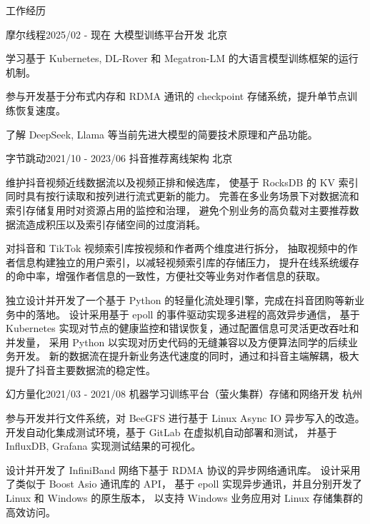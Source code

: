 \documentclass[
	a4paper,  %
	11pt,  %
]{resume}  %
\begin{document}
\begin{rSection}{工作经历}

	\begin{rSubsection}{摩尔线程}{2025/02 - 现在}{ 大模型训练平台开发 }{北京}
		\item 学习基于 Kubernetes, DL-Rover 和 Megatron-LM 的大语言模型训练框架的运行机制。
		\item 参与开发基于分布式内存和 RDMA 通讯的 checkpoint 存储系统，提升单节点训练恢复速度。
		\item 了解 DeepSeek, Llama 等当前先进大模型的简要技术原理和产品功能。
	\end{rSubsection}


	\begin{rSubsection}{字节跳动}{2021/10 - 2023/06}{ 抖音推荐离线架构 }{北京}
		\item 维护抖音视频近线数据流以及视频正排和候选库，
			  使基于 RocksDB 的 KV 索引同时具有按行读取和按列进行流式更新的能力。
			  完善在多业务场景下对数据流和索引存储复用时对资源占用的监控和治理，
			  避免个别业务的高负载对主要推荐数据流造成积压以及索引存储空间的过度消耗。
		\item 对抖音和 TikTok 视频索引库按视频和作者两个维度进行拆分，
			  抽取视频中的作者信息构建独立的用户索引，以减轻视频索引库的存储压力，
			  提升在线系统缓存的命中率，增强作者信息的一致性，方便社交等业务对作者信息的获取。
		\item 独立设计并开发了一个基于 Python 的轻量化流处理引擎，完成在抖音团购等新业务中的落地。
			  设计采用基于 epoll 的事件驱动实现多进程的高效异步通信，
			  基于 Kubernetes 实现对节点的健康监控和错误恢复，通过配置信息可灵活更改吞吐和并发量，
			  采用 Python 以实现对历史代码的无缝兼容以及方便算法同学的后续业务开发。
			  新的数据流在提升新业务迭代速度的同时，通过和抖音主端解耦，极大提升了抖音主要数据流的稳定性。
	\end{rSubsection}


	\begin{rSubsection}{幻方量化}{2021/03 - 2021/08}{ 机器学习训练平台（萤火集群）存储和网络开发 }{杭州}
		\item 参与开发并行文件系统，对 BeeGFS 进行基于 Linux Async IO 异步写入的改造。
			  开发自动化集成测试环境，基于 GitLab 在虚拟机自动部署和测试，
			  并基于 InfluxDB, Grafana 实现测试结果的可视化。
		\item 设计并开发了 InfiniBand 网络下基于 RDMA 协议的异步网络通讯库。
			  设计采用了类似于 Boost Asio 通讯库的 API，
			  基于 epoll 实现异步通讯，并且分别开发了 Linux 和 Windows 的原生版本，
			  以支持 Windows 业务应用对 Linux 存储集群的高效访问。
	\end{rSubsection}


\end{rSection}
\end{document}
